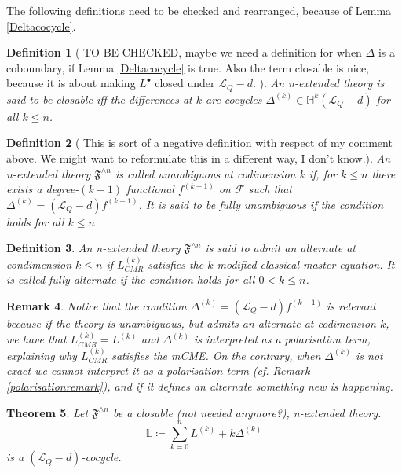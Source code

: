 \documentclass[a4paper,reqno]{amsart}
\newtheorem{definition}{Definition}
\newtheorem{theorem}[definition]{Theorem}
\newtheorem{remark}[definition]{Remark}
\newcommand{\LQ}{\mathcal{L}_{Q}}
\begin{document}
{\color{blue}The following definitions need to be checked and rearranged, because of Lemma \ref{Deltacocycle}.}





\begin{definition}[{\color{red} TO BE CHECKED, maybe we need a definition for when $\Delta$ is a coboundary, if Lemma \ref{Deltacocycle} is true. Also the term closable is nice, because it is about making $L^\bullet$ closed under $\LQ -d$.} ]
An n-extended theory is said to be \emph{closable} iff the differences at $k$ are cocycles $\Delta^{(k)}\in \mathbb{H}^{k}\left(\LQ-d\right)$ for all $k\leq n$.
\end{definition}


\begin{definition}[{\color{red} This is sort of a negative definition with respect of my comment above. We might want to reformulate this in a different way, I don't know.}]
An n-extended theory $\mathfrak{F}^{\wedge n}$ is called \emph{unambiguous at codimension $k$} if, for $k\leq n$ there exists a degree-$(k-1)$ functional $f^{(k-1)}$ on $\mathcal{F}$ such that $\Delta^{(k)} = (\LQ-d)f^{(k-1)}$. It is said to be fully unambiguous if the condition holds for all $k\leq n$.
\end{definition}

\begin{definition}
An n-extended theory $\mathfrak{F}^{\wedge n}$ is said to admit an \emph {alternate at condimension $k\leq n$} if $L^{(k)}_{CMR}$ satisfies the $k$-modified classical master equation. It is called \emph{fully alternate} if the condition holds for all $0<k\leq n$.
\end{definition}


\begin{remark}
Notice that the condition $\Delta^{(k)}=(\LQ-d)f^{(k-1)}$ is relevant because if the theory is unambiguous, but admits an alternate at codimension $k$, we have that $L^{(k)}_{CMR}=L^{(k)}$ and $\Delta^{(k)}$ is interpreted as a \emph{polarisation term}, explaining why $L^{(k)}_{CMR}$ satisfies the mCME. On the contrary, when $\Delta^{(k)}$ is not exact we cannot interpret it as a polarisation term (cf. Remark \ref{polarisationremark}), and if it defines an alternate something new is happening.
\end{remark}


\begin{theorem}
Let $\mathfrak{F}^{\wedge n}$ be a {\color{red}closable (not needed anymore?)}, n-extended theory.  
\begin{equation}
\mathbb{L}\coloneqq \sum_{k=0}^n L^{(k)} + k \Delta^{(k)}
\end{equation}
is a $\left(\LQ-d\right)$-cocycle.
\end{theorem}
\end{document}
